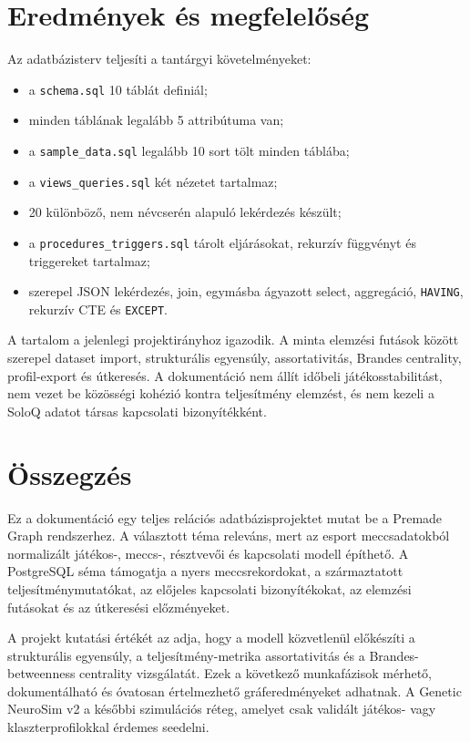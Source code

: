 \documentclass[12pt,a4paper]{article}
\begin{document}
\section{Eredmények és megfelelőség}

Az adatbázisterv teljesíti a tantárgyi követelményeket:

\begin{itemize}
  \item a \texttt{schema.sql} 10 táblát definiál;
  \item minden táblának legalább 5 attribútuma van;
  \item a \texttt{sample\_data.sql} legalább 10 sort tölt minden táblába;
  \item a \texttt{views\_queries.sql} két nézetet tartalmaz;
  \item 20 különböző, nem névcserén alapuló lekérdezés készült;
  \item a \texttt{procedures\_triggers.sql} tárolt eljárásokat, rekurzív függvényt és triggereket tartalmaz;
  \item szerepel JSON lekérdezés, join, egymásba ágyazott select, aggregáció, \texttt{HAVING}, rekurzív CTE és \texttt{EXCEPT}.
\end{itemize}

A tartalom a jelenlegi projektirányhoz igazodik. A minta elemzési futások között szerepel dataset import, strukturális egyensúly, assortativitás, Brandes centrality, profil-export és útkeresés. A dokumentáció nem állít időbeli játékosstabilitást, nem vezet be közösségi kohézió kontra teljesítmény elemzést, és nem kezeli a SoloQ adatot társas kapcsolati bizonyítékként.

\section{Összegzés}

Ez a dokumentáció egy teljes relációs adatbázisprojektet mutat be a Premade Graph rendszerhez. A választott téma releváns, mert az esport meccsadatokból normalizált játékos-, meccs-, résztvevői és kapcsolati modell építhető. A PostgreSQL séma támogatja a nyers meccsrekordokat, a származtatott teljesítménymutatókat, az előjeles kapcsolati bizonyítékokat, az elemzési futásokat és az útkeresési előzményeket.

A projekt kutatási értékét az adja, hogy a modell közvetlenül előkészíti a strukturális egyensúly, a teljesítmény-metrika assortativitás és a Brandes-betweenness centrality vizsgálatát. Ezek a következő munkafázisok mérhető, dokumentálható és óvatosan értelmezhető gráferedményeket adhatnak. A Genetic NeuroSim v2 a későbbi szimulációs réteg, amelyet csak validált játékos- vagy klaszterprofilokkal érdemes seedelni.
\end{document}
